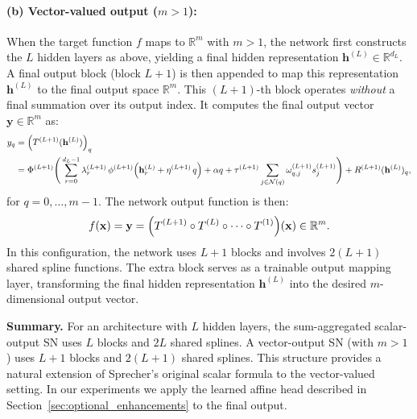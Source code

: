 \documentclass{article}
\theoremstyle{plain}
\theoremstyle{definition}
\theoremstyle{remark}
\begin{document}
\paragraph{(b) Vector-valued output ($m>1$):}
When the target function $f$ maps to $\mathbb{R}^m$ with $m>1$, the network first constructs the $L$ hidden layers as above, yielding a final hidden representation $\mathbf{h}^{(L)} \in \mathbb{R}^{d_L}$. A final output block (block $L+1$) is then appended to map this representation $\mathbf{h}^{(L)}$ to the final output space $\mathbb{R}^m$. This $(L+1)$-th block operates \emph{without} a final summation over its output index. It computes the final output vector $\mathbf{y} \in \mathbb{R}^m$ as:
\begin{equation*}
\begin{aligned}
 y_q &= \Bigl(T^{(L+1)}(\mathbf{h}^{(L)})\Bigr)_q  \\
 &= \Phi^{(L+1)}\Biggl(\,\sum_{r=0}^{d_L-1} \lambda^{(L+1)}_{r}\,\phi^{(L+1)}\Bigl(\mathbf{h}^{(L)}_r+\eta^{(L+1)}\,q\Bigr)+\alpha q + \tau^{(L+1)} \sum_{j \in \mathcal{N}(q)} \omega_{q,j}^{(L+1)} s_j^{(L+1)}\Biggr) + R^{(L+1)}(\mathbf{h}^{(L)})_q, 
\end{aligned}
\end{equation*}
for $q=0,\dots,m-1$. The network output function is then:
\begin{equation}\label{eq:defsn}
f(\mathbf{x}) = \mathbf{y} = \Bigl(T^{(L+1)} \circ T^{(L)} \circ \cdots \circ T^{(1)}\Bigr)(\mathbf{x}) \in \mathbb{R}^m. 
\end{equation}
In this configuration, the network uses $L+1$ blocks and involves $2(L+1)$ shared spline functions. The extra block serves as a trainable output mapping layer, transforming the final hidden representation $\mathbf{h}^{(L)}$ into the desired $m$-dimensional output vector.

\medskip
\noindent\textbf{Summary.} For an architecture with $L$ hidden layers, the sum-aggregated scalar-output SN uses $L$ blocks and $2L$ shared splines. A vector-output SN (with $m>1$) uses $L+1$ blocks and $2(L+1)$ shared splines. This structure provides a natural extension of Sprecher's original scalar formula to the vector-valued setting. In our experiments we apply the learned affine head described in Section~\ref{sec:optional_enhancements} to the final output.
\medskip
\end{document}
